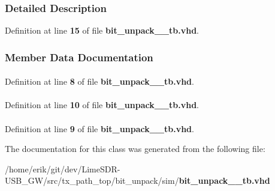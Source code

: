 \subsubsection{Detailed Description}


Definition at line {\bf 15} of file {\bf bit\+\_\+unpack\+\_\+\_\+tb.\+vhd}.



\subsubsection{Member Data Documentation}
\paragraph[{ieee}]{\hspace{0.3cm}{\ttfamily [Library]}}\label{classbit__unpack__64__tb_a0a6af6eef40212dbaf130d57ce711256}


Definition at line {\bf 8} of file {\bf bit\+\_\+unpack\+\_\+\_\+tb.\+vhd}.

\paragraph[{numeric\+\_\+std}]{\hspace{0.3cm}{\ttfamily [Package]}}\label{classbit__unpack__64__tb_a2edc34402b573437d5f25fa90ba4013e}


Definition at line {\bf 10} of file {\bf bit\+\_\+unpack\+\_\+\_\+tb.\+vhd}.

\paragraph[{std\+\_\+logic\+\_\+1164}]{\hspace{0.3cm}{\ttfamily [Package]}}\label{classbit__unpack__64__tb_acd03516902501cd1c7296a98e22c6fcb}


Definition at line {\bf 9} of file {\bf bit\+\_\+unpack\+\_\+\_\+tb.\+vhd}.



The documentation for this class was generated from the following file\+:\begin{DoxyCompactItemize}
\item 
/home/erik/git/dev/\+Lime\+S\+D\+R-\/\+U\+S\+B\+\_\+\+G\+W/src/tx\+\_\+path\+\_\+top/bit\+\_\+unpack/sim/{\bf bit\+\_\+unpack\+\_\+\_\+tb.\+vhd}\end{DoxyCompactItemize}
